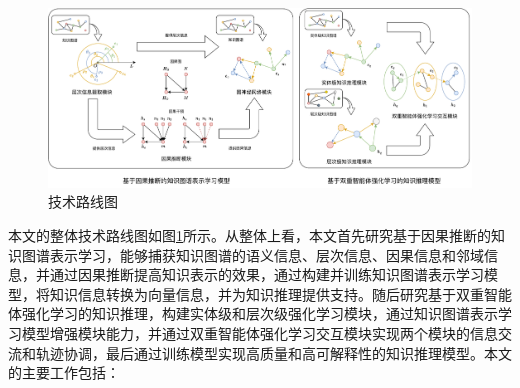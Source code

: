 \documentclass[algorithmlist, AutoFakeBold, AutoFakeSlant, figurelist, tablelist, nomlist, engineering]{seuthesix}
\begin{document}
\begin{figure}
  \centering
  \includegraphics[width=1.0\textwidth]{1_Total}
  \caption{技术路线图}
  \label{1_Total}
\end{figure}
本文的整体技术路线图如图\ref{1_Total}所示。从整体上看，本文首先研究基于因果推断的知识图谱表示学习，能够捕获知识图谱的语义信息、层次信息、因果信息和邻域信息，并通过因果推断提高知识表示的效果，通过构建并训练知识图谱表示学习模型，将知识信息转换为向量信息，并为知识推理提供支持。随后研究基于双重智能体强化学习的知识推理，构建实体级和层次级强化学习模块，通过知识图谱表示学习模型增强模块能力，并通过双重智能体强化学习交互模块实现两个模块的信息交流和轨迹协调，最后通过训练模型实现高质量和高可解释性的知识推理模型。本文的主要工作包括：
\end{document}
